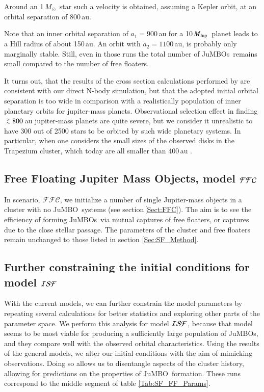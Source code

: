 \documentclass[submission,phys]{lib/SciPost}
\newcommand{\MSun}{\mbox{${M}_\odot$}}
\newcommand{\MJup}{\mbox{${M}_{\rm Jup}$}}
\def\apgt{\ {\raise-.5ex\hbox{$\buildrel>\over\sim$}}\ }
\newcommand{\jumbo}{\mbox{JuMBO}}
\newcommand{\jumbos}{\mbox{JuMBOs}}
\begin{document}
Around an 1\,\MSun\, star such a velocity is obtained,
assuming a Kepler orbit, at an orbital separation of 800\,au.


Note that an inner orbital separation of $a_1=900$\,au for a
10\,\MJup\, planet leads to a Hill radius of about 150\,au. An orbit
with $a_2=1100$\,au, is probably only marginally stable.  Still,
even in those runs the total number of \jumbos\, remains small
compared to the number of free floaters.

It turns
out, that the results of the cross section calculations performed by
\cite{2023arXiv231006016W} are consistent with our direct N-body
simulation, but that the adopted initial orbital separation is too
wide in comparison with a realistically population of inner planetary
orbits for jupiter-mass planets.  Observational selection effect in
finding $\apgt 800$\,au jupiter-mass planets are quite severe, but we
consider it unrealistic to have 300 out of 2500 stars to be orbited by
such wide planetary systems. In particular, when one considers the
small sizes of the observed disks in the Trapezium cluster, which
today are all smaller than 400\,au \cite{2005A&A...441..195V}.


\subsection{Free Floating Jupiter Mass Objects, model ${\cal FFC}$}

In scenario, $\mathcal{FFC}$, we initialize a number of single
Jupiter-mass objects in a cluster with no \jumbo\, systems (see
section\,\ref{Sect:FFC}).  The aim is to see the efficiency of forming
\jumbos\, via mutual captures of free floaters, or captures due to the
close stellar passage. The parameters of the cluster and free floaters
remain unchanged to those listed in section \ref{Sec:SF_Method}.

\subsection{Further constraining the initial conditions for model ${\cal ISF}$}

With the current models, we can further constrain the model parameters
by repeating several calculations for better statistics and exploring
other parts of the parameter space.  We perform this analysis for
model ${\cal ISF}$, because that model seems to be most viable for
producing a sufficiently large population of \jumbos, and they compare
well with the observed orbital characteristics.  Using the results of
the general models, we alter our initial conditions with the aim of
mimicking observations. Doing so allows us to disentangle aspects of
the cluster history, allowing for predictions on the properties of
\jumbo\, formation. These runs correspond to the middle segment of
table \ref{Tab:SF_FF_Params}.
    
\end{document}
